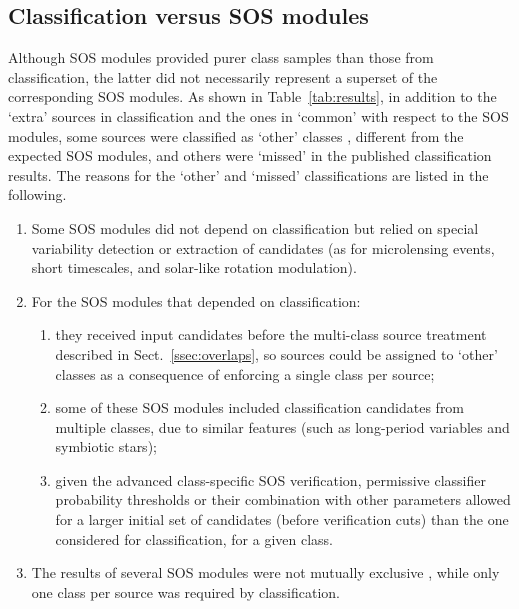 \documentclass[longauth]{aa}
\begin{document}
\subsection{Classification versus SOS modules\label{ssec:class-sos}}

Although SOS modules provided purer class samples than those from classification, the latter did not necessarily represent a superset of the corresponding SOS modules. 
As shown in Table~\ref{tab:results}, in addition to the `extra' sources in classification and the ones in `common' with respect to the SOS modules, some sources were classified as `other' classes \citep[see fig.~7 of][]{DR3-DPACP-162}, different from the expected SOS modules, and others were `missed' in the published classification results. The reasons for the `other' and `missed' classifications are listed in the following.
\begin{enumerate}
    \item Some SOS modules did not depend on classification but relied on special variability detection or extraction of candidates (as for microlensing events, short timescales, and solar-like rotation modulation).
    \item For the SOS modules that depended on classification:
    \begin{enumerate}
        \item they received input candidates before the multi-class source treatment described in Sect.~\ref{ssec:overlaps}, so sources could be assigned to `other' classes as a consequence of enforcing a single class per source;
        \item some of these SOS modules included classification candidates from multiple classes, due to similar features (such as long-period variables and symbiotic stars);
        \item given the advanced class-specific SOS verification, permissive classifier probability thresholds or their combination with other parameters allowed for a larger initial set of candidates (before verification cuts) than the one considered for classification, for a given class.
    \end{enumerate}
    \item The results of several SOS modules were not mutually exclusive \citep[see fig.~6 of][]{DR3-DPACP-162}, while only one class per source was required by classification.
\end{enumerate}


\end{document}
